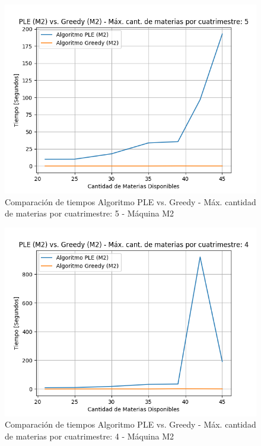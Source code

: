\documentclass[a4paper]{article}
\begin{document}
\begin{figure}[H]
\centering
\includegraphics[scale=0.65]{Imagenes/m2_PLE_vs_GREEDY_max_mat_5.png}\par
\caption{Comparación de tiempos Algoritmo PLE vs. Greedy - Máx. cantidad de materias por cuatrimestre: 5 - Máquina M2}
\end{figure}

\begin{figure}[H]
\centering
\includegraphics[scale=0.65]{Imagenes/m2_PLE_vs_GREEDY_max_mat_4.png}\par
\caption{Comparación de tiempos Algoritmo PLE vs. Greedy - Máx. cantidad de materias por cuatrimestre: 4 - Máquina M2}
\end{figure}
\end{document}
